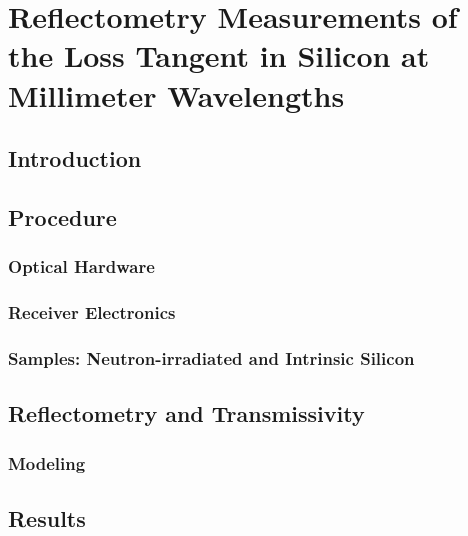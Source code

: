 \chapter{Reflectometry Measurements of the Loss Tangent in Silicon at Millimeter Wavelengths}
\label{ch:si}
\section{Introduction}
\section{Procedure}
\subsection{Optical Hardware}
\subsection{Receiver Electronics}
\subsection{Samples: Neutron-irradiated and Intrinsic Silicon}
\section{Reflectometry and Transmissivity}
\subsection{Modeling}
\section{Results}
